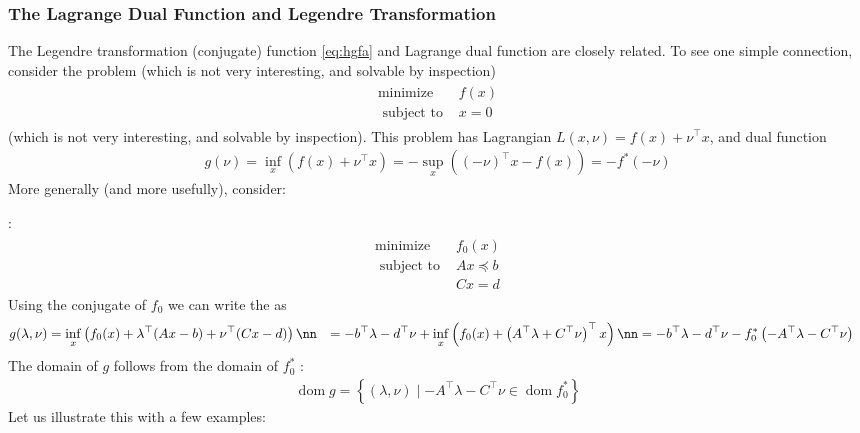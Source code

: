 \documentclass{article}
\begin{document}
\subsubsection{ The Lagrange Dual Function and Legendre Transformation}
The  Legendre transformation (conjugate) function \cref{eq:hgfa} and Lagrange dual function are closely related. To see one simple connection, consider the problem
(which is not very interesting, and solvable by inspection)
\begin{align*}
    \begin{array}{ll}\operatorname{minimize} & f(x) \\ \text { subject to } & x=0\end{array}
\end{align*}
(which is not very interesting, and solvable by inspection).  This problem has Lagrangian $L(x, \nu)=f(x)+\nu^{\top} x$, and dual function
\begin{align*}
g(\nu)=\inf _{x}\left(f(x)+\nu^{\top} x\right)=-\sup _{x}\left((-\nu)^{\top} x-f(x)\right)=-f^{*}(-\nu)
\end{align*}
More generally (and more usefully), consider: 

:
\begin{align*}
\begin{array}{ll}
\operatorname{minimize} & f_{0}(x) \\
\text { subject to } & A x \preceq b \\
& C x=d
\end{array}
\end{align*}
Using the conjugate of $f_{0}$ we can write the   as
\begin{align}
g(\lambda, \nu) &=\inf _{x}\left(f_{0}(x)+\lambda^{\top}(A x-b)+\nu^{\top}(C x-d)\right) \nn
&=-b^{\top} \lambda-d^{\top} \nu+\inf _{x}\left(f_{0}(x)+\left(A^{\top} \lambda+C^{\top} \nu\right)^{\top} x\right) \nn
&=-b^{\top} \lambda-d^{\top} \nu-f_{0}^{*}\left(-A^{\top} \lambda-C^{\top} \nu\right)\label{eq:hnjae}
\end{align}
The domain of $g$ follows from the domain of $f_{0}^{*}$ :
\begin{align*}
\operatorname{dom} g=\left\{(\lambda, \nu) \mid-A^{\top} \lambda-C^{\top} \nu \in \operatorname{dom} f_{0}^{*}\right\}
\end{align*}
Let us illustrate this with a few examples:
\end{document}
